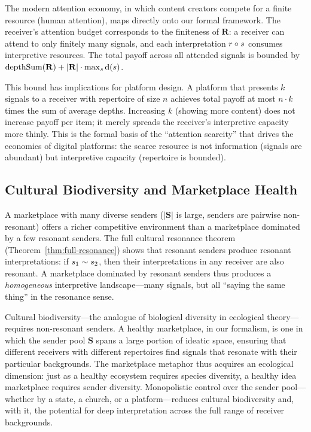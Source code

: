 The modern attention economy, in which content creators compete for a finite
resource (human attention), maps directly onto our formal framework.  The
receiver's attention budget corresponds to the finiteness of $\mathbf{R}$:
a receiver can attend to only finitely many signals, and each interpretation
$r \circ s$ consumes interpretive resources.  The total payoff across all
attended signals is bounded by $\operatorname{depthSum}(\mathbf{R}) +
|\mathbf{R}| \cdot \max_s \operatorname{d}(s)$.

This bound has implications for platform design.  A platform that presents
$k$ signals to a receiver with repertoire of size $n$ achieves total payoff
at most $n \cdot k$ times the sum of average depths.  Increasing $k$ (showing
more content) does not increase payoff per item; it merely spreads the
receiver's interpretive capacity more thinly.  This is the formal basis of
the ``attention scarcity'' that drives the economics of digital platforms:
the scarce resource is not information (signals are abundant) but
interpretive capacity (repertoire is bounded).

\subsection{Cultural Biodiversity and Marketplace Health}

A marketplace with many diverse senders ($|\mathbf{S}|$ is large, senders are
pairwise non-resonant) offers a richer competitive environment than a
marketplace dominated by a few resonant senders.  The full cultural resonance
theorem (Theorem~\ref{thm:full-resonance}) shows that resonant senders produce
resonant interpretations: if $s_1 \sim s_2$, then their interpretations in any
receiver are also resonant.  A marketplace dominated by resonant senders thus
produces a \emph{homogeneous} interpretive landscape---many signals, but all
``saying the same thing'' in the resonance sense.

Cultural biodiversity---the analogue of biological diversity in ecological
theory---requires non-resonant senders.  A healthy marketplace, in our
formalism, is one in which the sender pool $\mathbf{S}$ spans a large portion
of ideatic space, ensuring that different receivers with different repertoires
find signals that resonate with their particular backgrounds.  The marketplace
metaphor thus acquires an ecological dimension: just as a healthy ecosystem
requires species diversity, a healthy idea marketplace requires sender
diversity.  Monopolistic control over the sender pool---whether by a state, a
church, or a platform---reduces cultural biodiversity and, with it, the
potential for deep interpretation across the full range of receiver backgrounds.

